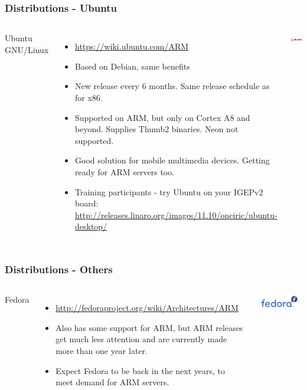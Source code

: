 \begin{frame}
  \frametitle{Distributions - Ubuntu}
  \small
  \begin{columns}[T]
    Ubuntu GNU/Linux
    \begin{itemize}
    \item \url{https://wiki.ubuntu.com/ARM}
    \item Based on Debian, same benefits
    \item New release every 6 months. Same release schedule as for
      x86.
    \item Supported on ARM, but only on Cortex A8 and beyond.
      Supplies Thumb2 binaries. Neon not supported.
    \item Good solution for mobile multimedia devices. Getting ready
      for ARM servers too.
    \item Training participants - try Ubuntu on your IGEPv2 board:\\
      \url{http://releases.linaro.org/images/11.10/oneiric/ubuntu-desktop/}
    \end{itemize}
    \includegraphics[width=\textwidth]{slides/sysdev-embedded-linux/ubuntu.png}\\
  \end{columns}
\end{frame}

\begin{frame}
  \frametitle{Distributions - Others}
  \begin{columns}[T]
    Fedora
    \begin{itemize}
    \item \url{http://fedoraproject.org/wiki/Architectures/ARM}
    \item Also has some support for ARM, but ARM releases get much less
      attention and are currently made more than one year later.
    \item Expect Fedora to be back in the next years, to meet demand for
      ARM servers.
    \end{itemize}
    \includegraphics[width=\textwidth]{slides/sysdev-embedded-linux/fedora.png}\\
  \end{columns}
\end{frame}

